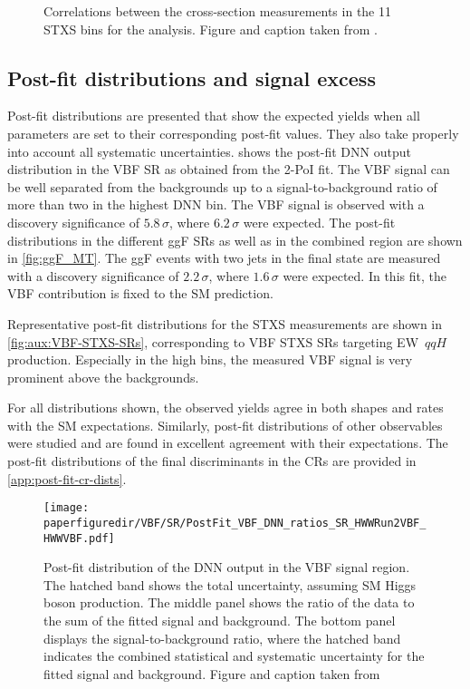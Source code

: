 \begin{figure}[htb]
  \centering
  \scalebox{0.8}{
    
  }
  \caption{
    Correlations between the cross-section measurements in the 11 STXS bins for the \hwwenmn analysis.
    Figure and caption taken from .
    \label{fig:STXS-correlation}
  }
\end{figure}

\subsection{Post-fit distributions and signal excess}
Post-fit distributions are presented that show the expected yields when all parameters are set to their corresponding post-fit values. They also take properly into account all systematic uncertainties.  shows the post-fit DNN output distribution in the VBF SR as obtained from the 2-PoI fit.
The VBF signal can be well separated from the backgrounds up to a signal-to-background ratio of more than two in the highest DNN bin. 
The VBF signal is observed with a discovery significance of $5.8\,\sigma$, where $6.2\,\sigma$ were expected.
The post-fit \mT distributions in the different ggF SRs as well as in the combined region are shown in \cref{fig:ggF_MT}.
The ggF events with two jets in the final state are measured with a discovery significance of $2.2\,\sigma$, where $1.6\,\sigma$ were expected. In this fit, the VBF contribution is fixed to the SM prediction.

Representative post-fit distributions for the STXS measurements are shown in \cref{fig:aux:VBF-STXS-SRs}, corresponding to VBF STXS SRs targeting EW~$qqH$ production. 
Especially in the high \mjj bins, the measured VBF signal is very prominent above the backgrounds. 

For all distributions shown, the observed yields agree in both shapes and rates with the SM expectations.
Similarly, post-fit distributions of other observables were studied and are found in excellent agreement with their expectations. The post-fit distributions of the final discriminants in the CRs are provided in \cref{app:post-fit-cr-dists}. 

\begin{figure}[htb]
  \centering
  \texttt{[image: \\paperfiguredir/VBF/SR/PostFit\_VBF\_DNN\_ratios\_SR\_HWWRun2VBF\_HWWVBF.pdf]}
  \caption{
    Post-fit distribution of the DNN output in the VBF signal region.
    The hatched band shows the total uncertainty, assuming SM Higgs boson production.
    The middle panel shows the ratio of the data to the sum of the fitted signal and background.
    The bottom panel displays the signal-to-background ratio, where the hatched band indicates the combined statistical and systematic uncertainty for the fitted signal and background.
    Figure and caption taken from 
  }
  \label{fig:VBF_DNN}
\end{figure}

